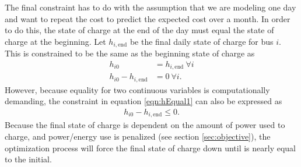 \par The final constraint has to do with the assumption that we are modeling one day and want to repeat the cost to predict the expected cost over a month. In order to do this, the state of charge at the end of the day must equal the state of charge at the beginning. Let $h_{i,\text{end}}$ be the final daily state of charge for bus $i$. This is constrained to be the same as the beginning state of charge as
\begin{equation} \label{eqn:hEqual1} \begin{aligned}
	h_{i0} &= h_{i,\text{end}} \ \forall i \\
	h_{i0} - h_{i,\text{end}} &= 0 \ \forall i.  
\end{aligned} \end{equation}
However, because equality for two continuous variables is computationally demanding, the constraint in equation \ref{eqn:hEqual1} can also be expressed as 
\begin{equation} \begin{aligned}
	h_{i0} - h_{i,\text{end}} \le 0.
\end{aligned} \end{equation}
Because the final state of charge is dependent on the amount of power used to charge, and power/energy use is penalized (see section \ref{sec:objective}), the optimization process will force the final state of charge down until is nearly equal to the initial.
